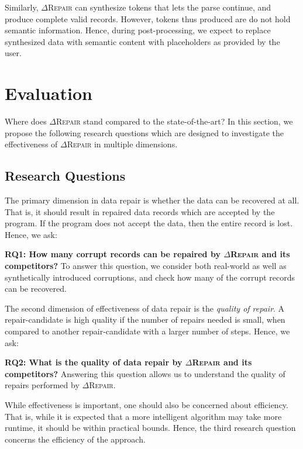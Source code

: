\documentclass[acmsmall,screen,review,anonymous]{acmart}
\newcommand{\dtask}{data repair\xspace}
\newcommand{\approach}{\textsc{$\Delta$Repair}\xspace}
\newcommand{\drepair}{\approach}
\begin{document}
Similarly,
\drepair can synthesize tokens that lets the parse continue, and produce
complete valid records. However, tokens thus produced are do not hold semantic information.
Hence, during post-processing, we expect to replace synthesized data with
semantic content with placeholders as provided by the user.

\section{Evaluation}
\label{sec:evaluation}
Where does \drepair stand compared to the state-of-the-art? In this section, we
propose the following research questions which are designed to investigate the
effectiveness of \drepair in multiple dimensions.

\subsection{Research Questions}
The primary dimension in \dtask is whether the data can be recovered at all.
That is, it should result in repaired data records which are accepted by the
program. If the program does not accept the data, then the entire record
is lost.
Hence, we ask:

\noindent\textbf{RQ1: How many corrupt records can be repaired by \drepair and its competitors?}
To answer this question, we consider both real-world as well as synthetically
introduced corruptions, and check how many of the corrupt records can be
recovered.

The second dimension of effectiveness of \dtask is the \emph{quality of repair}.
A repair-candidate is high quality if the number of repairs needed is small,
when compared to another repair-candidate with a larger number of steps.
Hence, we ask:

\noindent\textbf{RQ2: What is the quality of \dtask by \drepair and its competitors?}
Answering this question allows us to understand the quality of repairs
performed by \drepair.

While effectiveness is important, one should also be concerned about efficiency.
That is, while it is expected that a more intelligent algorithm may take more
runtime, it should be within practical bounds. Hence, the third research
question concerns the efficiency of the approach.
\end{document}
